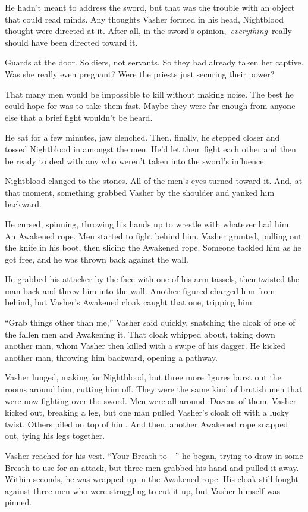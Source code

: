 He hadn’t meant to address the sword, but that was the trouble with an object that could read minds. Any thoughts Vasher formed in his head, Nightblood thought were directed at it. After all, in the sword’s opinion,~\textit{everything}~really should have been directed toward it.

Guards at the door. Soldiers, not servants. So they had already taken her captive. Was she really even pregnant? Were the priests just securing their power?

That many men would be impossible to kill without making noise. The best he could hope for was to take them fast. Maybe they were far enough from anyone else that a brief fight wouldn’t be heard.

He sat for a few minutes, jaw clenched. Then, finally, he stepped closer and tossed Nightblood in amongst the men. He’d let them fight each other and then be ready to deal with any who weren’t taken into the sword’s influence.

Nightblood clanged to the stones. All of the men’s eyes turned toward it. And, at that moment, something grabbed Vasher by the shoulder and yanked him backward.

He cursed, spinning, throwing his hands up to wrestle with whatever had him. An Awakened rope. Men started to fight behind him. Vasher grunted, pulling out the knife in his boot, then slicing the Awakened rope. Someone tackled him as he got free, and he was thrown back against the wall.

He grabbed his attacker by the face with one of his arm tassels, then twisted the man back and threw him into the wall. Another figured charged him from behind, but Vasher’s Awakened cloak caught that one, tripping him.

“Grab things other than me,” Vasher said quickly, snatching the cloak of one of the fallen men and Awakening it. That cloak whipped about, taking down another man, whom Vasher then killed with a swipe of his dagger. He kicked another man, throwing him backward, opening a pathway.

Vasher lunged, making for Nightblood, but three more figures burst out the rooms around him, cutting him off. They were the same kind of brutish men that were now fighting over the sword. Men were all around. Dozens of them. Vasher kicked out, breaking a leg, but one man pulled Vasher’s cloak off with a lucky twist. Others piled on top of him. And then, another Awakened rope snapped out, tying his legs together.

Vasher reached for his vest. “Your Breath to—” he began, trying to draw in some Breath to use for an attack, but three men grabbed his hand and pulled it away. Within seconds, he was wrapped up in the Awakened rope. His cloak still fought against three men who were struggling to cut it up, but Vasher himself was pinned.

